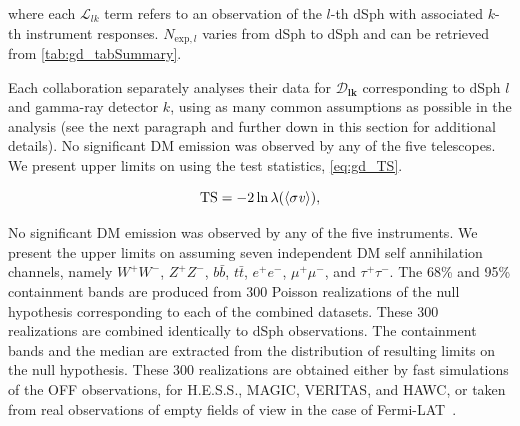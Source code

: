 where each $\mathcal{L}_{lk}$ term refers to an observation of the $l$-th dSph with associated $k$-th instrument responses.
$ N_{\mathrm{exp},l} $ varies from dSph to dSph and can be retrieved from \cref{tab:gd_tabSummary}.

Each collaboration separately analyses their data for $\bm{\mathcal{D}_{lk}}$ corresponding to dSph $l$ and gamma-ray detector $k$, using as many common assumptions as possible in the analysis (see the next paragraph and further down in this section for additional details).
%
No significant DM emission was observed by any of the five telescopes.
We present upper limits on \sv using the test statistics, \cref{eq:gd_TS}.

\begin{equation}
    \mathrm{TS} = -2 \ln{ \lambda(\langle \sigma \mathit{v} \rangle)},
\end{equation}

\sloppy No significant DM emission was observed by any of the five instruments.
We present the upper limits on \sv assuming seven independent DM self annihilation channels, namely $W^+W^-$, $Z^+Z^-$, $b\bar{b}$, $t\bar{t}$, $e^+e^-$, $\mu^+\mu^-$, and $\tau^+\tau^-$.
The 68\% and 95\% containment bands are produced from 300 Poisson realizations of the null hypothesis corresponding to each of the combined datasets.
These 300 realizations are combined identically to dSph observations.
The containment bands and the median are extracted from the distribution of resulting limits on the null hypothesis.
These 300 realizations are obtained either by fast simulations of the OFF observations, for H.E.S.S., MAGIC, VERITAS, and HAWC, or taken from real observations of empty fields of view in the case of Fermi-LAT~\cite{2015PhRvL.115w1301A,Fermi-LAT:2016uux,2021PhRvD.103l3005D}.

